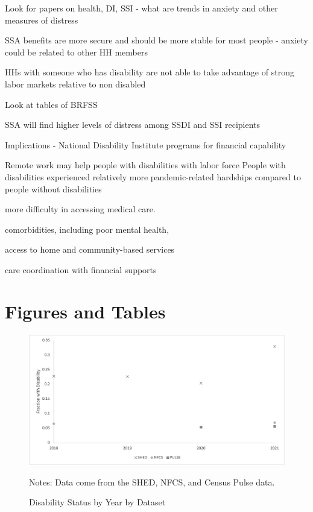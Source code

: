 \documentclass[12pt]{article}
\begin{document}
Look for papers on health, DI, SSI - what are trends in anxiety and other measures of distress

SSA benefits are more secure and should  be more stable for most people  - anxiety could be related to other HH members

HHs with someone who has disability are not able to take advantage of strong labor markets relative to non disabled

Look at tables of BRFSS

\cite{blanchflower2022covid}

SSA will find higher levels of distress among SSDI and SSI recipients 

Implications - National Disability Institute programs for financial capability


\cite{kruse2022disability}
Remote work may help people with disabilities with labor force
People with disabilities experienced relatively more pandemic-related hardships compared to people without disabilities

more difficulty in accessing medical care.

comorbidities, including poor mental health,

access to home and community-based services 

 care coordination  with financial supports
 
 \cite{mitra2022advancing}
 

\section{Figures and Tables}


 \begin{figure}[h!]\label{Disability}
\caption{Disability Status by Year by Dataset}
\centering
\includegraphics[scale=0.4]{Exhibits/Figure1.png}
\medskip 
\begin{minipage}{0.65\textwidth} 
{\footnotesize Notes: Data come from the SHED, NFCS, and Census Pulse data.  \par}
\end{minipage}
\end{figure}
 
\end{document}
